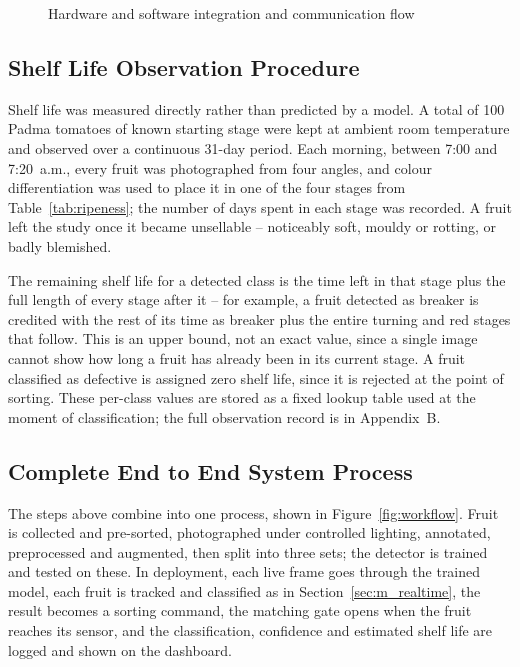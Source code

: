 \begin{figure}[H]
\centering
{}
\caption{Hardware and software integration and communication flow}
\label{fig:integration}
\end{figure}

\subsection{Shelf Life Observation Procedure}
\label{sec:m_shelflife}

Shelf life was measured directly rather than predicted by a model. A total of 100 Padma tomatoes of known starting stage were kept at ambient room temperature and observed over a continuous 31-day period. Each morning, between 7:00 and 7:20~a.m., every fruit was photographed from four angles, and colour differentiation was used to place it in one of the four stages from Table~\ref{tab:ripeness}; the number of days spent in each stage was recorded. A fruit left the study once it became unsellable -- noticeably soft, mouldy or rotting, or badly blemished.


The remaining shelf life for a detected class is the time left in that stage plus the full length of every stage after it -- for example, a fruit detected as breaker is credited with the rest of its time as breaker plus the entire turning and red stages that follow. This is an upper bound, not an exact value, since a single image cannot show how long a fruit has already been in its current stage. A fruit classified as defective is assigned zero shelf life, since it is rejected at the point of sorting. These per-class values are stored as a fixed lookup table used at the moment of classification; the full observation record is in Appendix~B.

\subsection{Complete End to End System Process}
\label{sec:m_endtoend}

The steps above combine into one process, shown in Figure~\ref{fig:workflow}. Fruit is collected and pre-sorted, photographed under controlled lighting, annotated, preprocessed and augmented, then split into three sets; the detector is trained and tested on these. In deployment, each live frame goes through the trained model, each fruit is tracked and classified as in Section~\ref{sec:m_realtime}, the result becomes a sorting command, the matching gate opens when the fruit reaches its sensor, and the classification, confidence and estimated shelf life are logged and shown on the dashboard.

